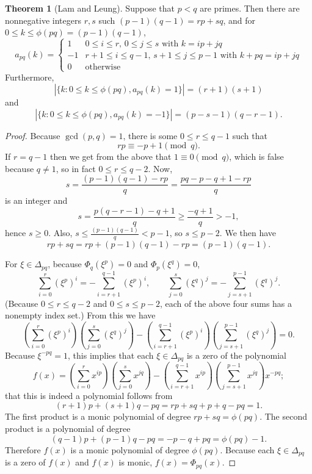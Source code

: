 \documentclass{article}
\theoremstyle{definition}
\newtheorem{theorem}{Theorem}
\theoremstyle{definition}
\begin{document}
\begin{theorem}[Lam and Leung]
Suppose that $p<q$ are primes. Then there are  nonnegative integers $r,s$ such
$(p-1)(q-1)=rp+sq$, and for
$0 \leq k \leq \phi(pq)=(p-1)(q-1)$,
\[
a_{pq}(k) = \begin{cases}
1&\textrm{$0 \leq i \leq r$, $0 \leq j \leq s$ with $k=ip+jq$}\\
-1&\textrm{$r+1 \leq i \leq q-1$, $s+1 \leq j \leq p-1$ with $k+pq=ip+jq$}\\
0&\textrm{otherwise}
\end{cases}
\]
Furthermore,
\[
|\{k: 0 \leq k \leq \phi(pq), a_{pq}(k)=1\}| = (r+1)(s+1)
\]
and
\[
|\{k: 0 \leq k \leq \phi(pq), a_{pq}(k)=-1\}| = (p-s-1)(q-r-1).
\]
\end{theorem}
\begin{proof}
Because $\gcd(p,q)=1$, there is some $0 \leq r \leq q-1$ such that
\[
rp   \equiv -p+1  \pmod{q}.
\]
If $r=q-1$ then we get
from the above that $1 \equiv 0 \pmod{q}$, which is false because $q \neq 1$, so in fact
$0 \leq r \leq q-2$. 
Now,
\[
s=\frac{(p-1)(q-1)-rp}{q}=\frac{pq-p-q+1-rp}{q} 
\]
is an integer and
\[
s = \frac{p(q-r-1)-q+1}{q} \geq \frac{-q+1}{q}>-1,
\]
hence $s \geq 0$. Also,
$s \leq \frac{(p-1)(q-1)}{q} < p-1$, so $s \leq p-2$. We then have
\[
rp+sq=rp+(p-1)(q-1)-rp = (p-1)(q-1).
\]
 
For $\xi \in \Delta_{pq}$, because $\Phi_q(\xi^p)=0$ and $\Phi_p(\xi^q)=0$,
\[
\sum_{i=0}^r (\xi^p)^i = - \sum_{i=r+1}^{q-1} (\xi^p)^i,
\qquad
\sum_{j=0}^s (\xi^q)^j = - \sum_{j=s+1}^{p-1} (\xi^q)^j.
\]
(Because $0 \leq r \leq q-2$ and $0 \leq s \leq p-2$, each of the above four sums has a nonempty index
set.)
From this we have
\[
\left( \sum_{i=0}^r (\xi^p)^i \right) \left(\sum_{j=0}^s (\xi^q)^j \right)
-\left(\sum_{i=r+1}^{q-1} (\xi^p)^i\right) \left( \sum_{j=s+1}^{p-1} (\xi^q)^j\right)=0.
\]
Because $\xi^{-pq}=1$, 
this implies that each $\xi \in \Delta_{pq}$ is a zero of the polynomial
\[
f(x)  = \left( \sum_{i=0}^r x^{ip} \right) \left(\sum_{j=0}^s x^{jq} \right)
-\left(\sum_{i=r+1}^{q-1} x^{ip} \right) \left( \sum_{j=s+1}^{p-1} x^{jq} \right) x^{-pq};
\]
that this is indeed a polynomial follows from
\[
(r+1)p+(s+1)q-pq=rp+sq+p+q-pq=1.
\]
The first product is a monic polynomial of degree $rp+sq=\phi(pq)$. The second product is a polynomial
of degree
\[
(q-1)p+(p-1)q-pq=-p-q+pq=\phi(pq)-1.
\]
Therefore $f(x)$ is a monic polynomial of degree
$\phi(pq)$. Because each $\xi \in \Delta_{pq}$ is a zero of $f(x)$ and $f(x)$ is monic,
$f(x)=\Phi_{pq}(x)$. 
\end{proof}
\end{document}
